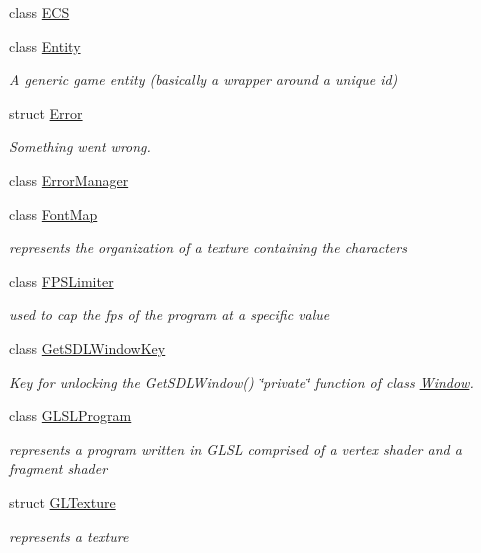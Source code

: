 \begin{DoxyCompactItemize}
class \hyperlink{classnta_1_1ECS}{E\+CS}
\item 
class \hyperlink{classnta_1_1Entity}{Entity}
\begin{DoxyCompactList}\small\item\em A generic game entity (basically a wrapper around a {\itshape unique} id) \end{DoxyCompactList}\item 
struct \hyperlink{structnta_1_1Error}{Error}
\begin{DoxyCompactList}\small\item\em Something went wrong. \end{DoxyCompactList}\item 
class \hyperlink{classnta_1_1ErrorManager}{Error\+Manager}
\item 
class \hyperlink{classnta_1_1FontMap}{Font\+Map}
\begin{DoxyCompactList}\small\item\em represents the organization of a texture containing the characters \end{DoxyCompactList}\item 
class \hyperlink{classnta_1_1FPSLimiter}{F\+P\+S\+Limiter}
\begin{DoxyCompactList}\small\item\em used to cap the fps of the program at a specific value \end{DoxyCompactList}\item 
class \hyperlink{classnta_1_1GetSDLWindowKey}{Get\+S\+D\+L\+Window\+Key}
\begin{DoxyCompactList}\small\item\em Key for unlocking the Get\+S\+D\+L\+Window() \char`\"{}private\char`\"{} function of class \hyperlink{classnta_1_1Window}{Window}. \end{DoxyCompactList}\item 
class \hyperlink{classnta_1_1GLSLProgram}{G\+L\+S\+L\+Program}
\begin{DoxyCompactList}\small\item\em represents a program written in G\+L\+SL comprised of a vertex shader and a fragment shader \end{DoxyCompactList}\item 
struct \hyperlink{structnta_1_1GLTexture}{G\+L\+Texture}
\begin{DoxyCompactList}\small\item\em represents a texture \end{DoxyCompactList}\item 

\end{DoxyCompactItemize}
